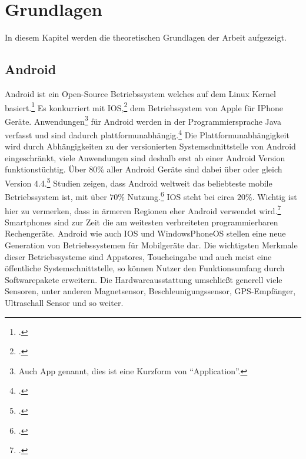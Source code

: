 \section{Grundlagen}
	In diesem Kapitel werden die theoretischen Grundlagen der Arbeit aufgezeigt.
\subsection{Android}\label{ssec:android}
	Android ist ein Open-Source Betriebssystem welches auf dem Linux Kernel basiert.\footcite{android} Es konkurriert mit IOS,\footcite{ios} dem Betriebssystem von Apple für IPhone Geräte. Anwendungen\footnote{Auch App genannt, dies ist eine Kurzform von \enquote{Application}.} für Android werden in der Programmiersprache Java verfasst und sind dadurch plattformunabhängig.\footcite{java} Die Plattformunabhängigkeit wird durch Abhängigkeiten zu der versionierten Systemschnittstelle von Android eingeschränkt, viele Anwendungen sind deshalb erst ab einer Android Version funktionstüchtig. Über $80$\% aller Android Geräte sind dabei über oder gleich Version 4.4.\footcite{android-fragmentation}
	Studien zeigen, dass Android weltweit das beliebteste mobile Betriebssystem ist, mit über $70$\% Nutzung.\footcite[\url{http://gs.statcounter.com/\#mobile_os-ww-monthly-200812-201701}]{android-stats} IOS steht bei circa $20$\%. Wichtig ist hier zu vermerken, dass in ärmeren Regionen eher Android verwendet wird.\footcite[\url{http://gs.statcounter.com/\#mobile_os-ww-monthly-201701-201701-map}]{android-stats} Smartphones sind zur Zeit die am weitesten verbreiteten programmierbaren Rechengeräte.
	Android wie auch IOS und WindowsPhoneOS stellen eine neue Generation von Betriebssystemen für Mobilgeräte dar. Die wichtigsten Merkmale dieser Betriebssysteme sind Appstores, Toucheingabe und auch meist eine öffentliche Systemschnittstelle, so können Nutzer den Funktionsumfang durch Softwarepakete erweitern.
	Die Hardwareausstattung umschließt generell viele Sensoren, unter anderen Magnetsensor, Beschleunigungssensor, GPS-Empfänger, Ultraschall Sensor und so weiter.

